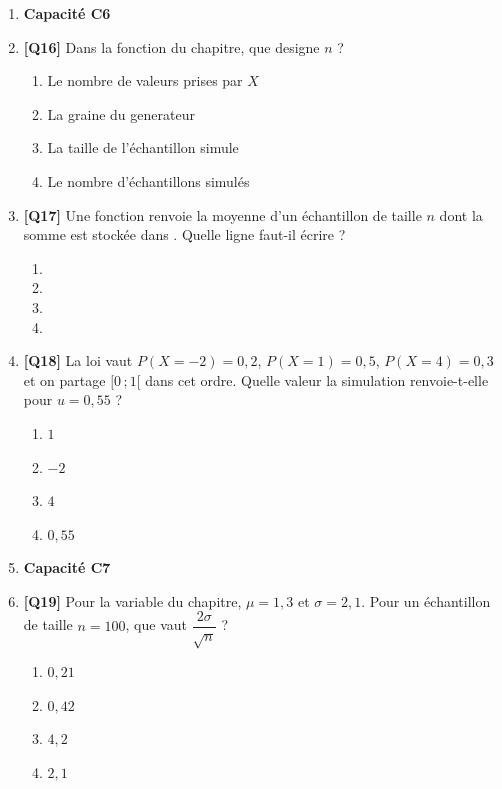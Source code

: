\begin{enumerate}
\item[] \textbf{Capacité C6}

\item \textbf{[Q16]} Dans la fonction  du chapitre, que designe $n$ ?
  \begin{enumerate}[label=\Alph*.]
    \item Le nombre de valeurs prises par $X$
    \item La graine du generateur
    \item La taille de l'échantillon simule
    \item Le nombre d'échantillons simulés
  \end{enumerate}

\item \textbf{[Q17]} Une fonction renvoie la moyenne d'un échantillon de taille $n$ dont la somme est stockée dans . Quelle ligne faut-il écrire ?
  \begin{enumerate}[label=\Alph*.]
    \item {}
    \item {}
    \item {}
    \item {}
  \end{enumerate}

\item \textbf{[Q18]} La loi vaut $P(X=-2)=0{,}2$, $P(X=1)=0{,}5$, $P(X=4)=0{,}3$ et on partage $[0\,;1[$ dans cet ordre. Quelle valeur la simulation renvoie-t-elle pour $u=0{,}55$ ?
  \begin{enumerate}[label=\Alph*.]
    \item $1$
    \item $-2$
    \item $4$
    \item $0{,}55$
  \end{enumerate}

\item[] \textbf{Capacité C7}

\item \textbf{[Q19]} Pour la variable du chapitre, $\mu=1{,}3$ et $\sigma=2{,}1$. Pour un échantillon de taille $n=100$, que vaut $\dfrac{2\sigma}{\sqrt{n}}$ ?
  \begin{enumerate}[label=\Alph*.]
    \item $0{,}21$
    \item $0{,}42$
    \item $4{,}2$
    \item $2{,}1$
  \end{enumerate}


\end{enumerate}
